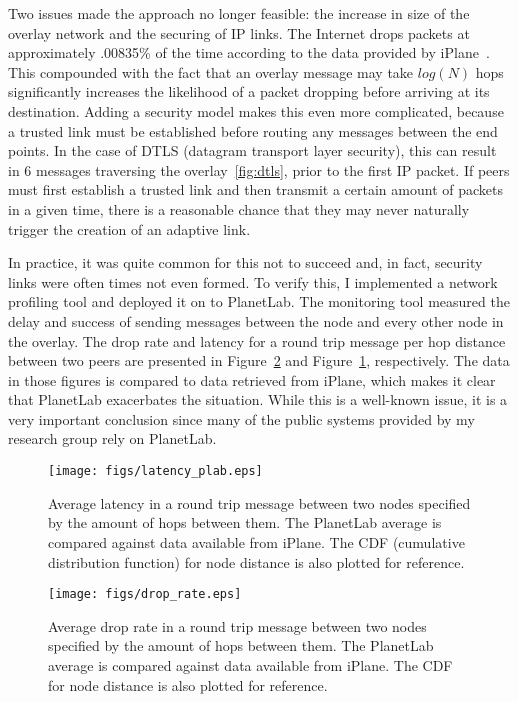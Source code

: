 Two issues made the approach no longer feasible:  the increase in size of the
overlay network and the securing of IP links.  The Internet drops packets at
approximately .00835\% of the time according to the data provided by
iPlane~\cite{iplane}.  This compounded with the fact that an overlay message
may take $log(N)$ hops significantly increases the likelihood of a packet
dropping before arriving at its destination.  Adding a security model makes
this even more complicated, because a trusted link must be established before
routing any messages between the end points.  In the case of DTLS (datagram
transport layer security), this can result in 6 messages traversing the
overlay~\ref{fig:dtls}, prior to the first IP packet.  If peers must first
establish a trusted link and then transmit a certain amount of packets in a
given time, there is a reasonable chance that they may never naturally trigger
the creation of an adaptive link.

In practice, it was quite common for this not to succeed and, in fact, security
links were often times not even formed.  To verify this, I implemented a
network profiling tool and deployed it on to PlanetLab.  The monitoring tool
measured the delay and success of sending messages between the node and every
other node in the overlay.  The drop rate and latency for a round trip message
per hop distance between two peers are presented in
Figure~\ref{fig:drop_rate_plab} and Figure~\ref{fig:latency_plab},
respectively.  The data in those figures is compared to data retrieved from
iPlane, which makes it clear that PlanetLab exacerbates the situation.  While
this is a well-known issue, it is a very important conclusion since many of the
public systems provided by my research group rely on PlanetLab.

\begin{figure}[ht]
\centering
\texttt{[image: figs/latency\_plab.eps]}
\caption[Latency in PlanetLab deployment]{Average latency in a round trip
message between two nodes specified by the amount of hops between them.  The
PlanetLab average is compared against data available from iPlane.  The CDF
(cumulative distribution function) for node distance is also plotted for
reference.}
\label{fig:latency_plab}
\end{figure}

\begin{figure}[ht]
\centering
\texttt{[image: figs/drop\_rate.eps]}
\caption[Drop rate in PlanetLab deployment]{Average drop rate in a round trip
message between two nodes specified by the amount of hops between them.  The
PlanetLab average is compared against data available from iPlane.  The CDF for
node distance is also plotted for reference.}
\label{fig:drop_rate_plab}
\end{figure}

